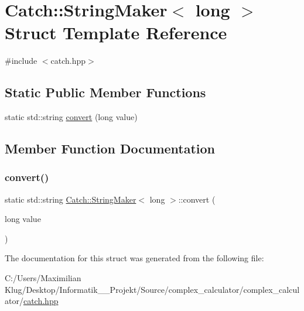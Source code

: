 \hypertarget{struct_catch_1_1_string_maker_3_01long_01_4}{}\section{Catch\+:\+:String\+Maker$<$ long $>$ Struct Template Reference}
\label{struct_catch_1_1_string_maker_3_01long_01_4}


{\ttfamily \#include $<$catch.\+hpp$>$}

\subsection*{Static Public Member Functions}
\begin{DoxyCompactItemize}
\item 
static std\+::string \mbox{\hyperlink{struct_catch_1_1_string_maker_3_01long_01_4_a1c0c56497813e7a6425c5411d5e66447}{convert}} (long value)
\end{DoxyCompactItemize}


\subsection{Member Function Documentation}
\mbox{\label{struct_catch_1_1_string_maker_3_01long_01_4_a1c0c56497813e7a6425c5411d5e66447}} 
\subsubsection{\texorpdfstring{convert()}{convert()}}
{\footnotesize\ttfamily static std\+::string \mbox{\hyperlink{struct_catch_1_1_string_maker}{Catch\+::\+String\+Maker}}$<$ long $>$\+::convert (\begin{DoxyParamCaption}\item[{long}]{value }\end{DoxyParamCaption})\hspace{0.3cm}{\ttfamily [static]}}



The documentation for this struct was generated from the following file\+:\begin{DoxyCompactItemize}
\item 
C\+:/\+Users/\+Maximilian Klug/\+Desktop/\+Informatik\+\_\+\_\+\+Projekt/\+Source/complex\+\_\+calculator/complex\+\_\+calculator/\mbox{\hyperlink{catch_8hpp}{catch.\+hpp}}\end{DoxyCompactItemize}
